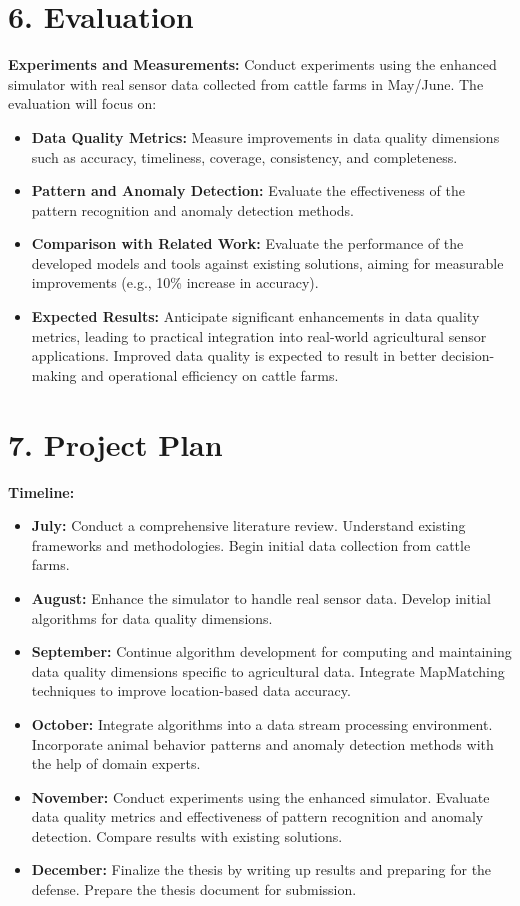 \documentclass[12pt]{article}
\begin{document}
\section*{6. Evaluation}
\textbf{Experiments and Measurements:} Conduct experiments using the enhanced simulator with real sensor data collected from cattle farms in May/June. The evaluation will focus on:
\begin{itemize}
    \item \textbf{Data Quality Metrics:} Measure improvements in data quality dimensions such as accuracy, timeliness, coverage, consistency, and completeness.
    \item \textbf{Pattern and Anomaly Detection:} Evaluate the effectiveness of the pattern recognition and anomaly detection methods.
    \item \textbf{Comparison with Related Work:} Evaluate the performance of the developed models and tools against existing solutions, aiming for measurable improvements (e.g., 10\% increase in accuracy).
    \item \textbf{Expected Results:} Anticipate significant enhancements in data quality metrics, leading to practical integration into real-world agricultural sensor applications. Improved data quality is expected to result in better decision-making and operational efficiency on cattle farms.
\end{itemize}

\section*{7. Project Plan}
\textbf{Timeline:}
\begin{itemize}
    \item \textbf{July:} Conduct a comprehensive literature review. Understand existing frameworks and methodologies. Begin initial data collection from cattle farms.
    \item \textbf{August:} Enhance the simulator to handle real sensor data. Develop initial algorithms for data quality dimensions.
    \item \textbf{September:} Continue algorithm development for computing and maintaining data quality dimensions specific to agricultural data. Integrate MapMatching techniques to improve location-based data accuracy.
    \item \textbf{October:} Integrate algorithms into a data stream processing environment. Incorporate animal behavior patterns and anomaly detection methods with the help of domain experts.
    \item \textbf{November:} Conduct experiments using the enhanced simulator. Evaluate data quality metrics and effectiveness of pattern recognition and anomaly detection. Compare results with existing solutions.
    \item \textbf{December:} Finalize the thesis by writing up results and preparing for the defense. Prepare the thesis document for submission.
\end{itemize}
\end{document}
